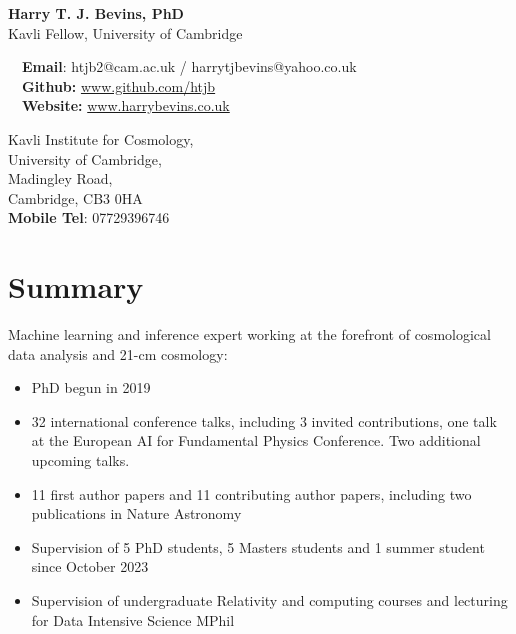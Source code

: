 \documentclass{article}
\begin{document}
\small

\begin{center}
\Large
\textbf{{\color{blue}Harry T. J. Bevins, PhD}}\\
\large
Kavli Fellow, University of Cambridge
\end{center}

\begin{minipage}[ht]{0.6\linewidth}
	\faEnvelope~~\textbf{Email}: htjb2@cam.ac.uk / harrytjbevins@yahoo.co.uk\\
	\faGithub~~\textbf{Github:} \url{www.github.com/htjb}\\
	\faGlobe~~\textbf{Website:} \url{www.harrybevins.co.uk}
\end{minipage}
\begin{minipage}[ht]{0.3\linewidth}
	\begin{flushright}
	Kavli Institute for Cosmology, \\
    University of Cambridge,\\
    Madingley Road,\\
    Cambridge, CB3 0HA\\
    \textbf{Mobile Tel}: 07729396746 \\
	\end{flushright}
\end{minipage}

\section*{Summary}

\noindent Machine learning and inference expert working at the forefront of cosmological data analysis and 21-cm cosmology:
\begin{itemize}
    \item PhD begun in 2019
    \item  32 international conference talks, including 3 invited contributions, one talk at the European AI for Fundamental Physics Conference. Two additional upcoming talks.
    \item 11 first author papers and 11 contributing author papers, including two publications in Nature Astronomy
    \item Supervision of 5 PhD students, 5 Masters students and 1 summer student since October 2023
    \item Supervision of undergraduate Relativity and computing courses and lecturing for Data Intensive Science MPhil
    
\end{itemize}
\end{document}
